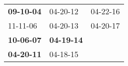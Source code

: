 \begin{supertabular}{p{0.33\columnwidth}p{0.33\columnwidth}p{0.33\columnwidth}}
 \textbf{09-10-04\textsuperscript{}} &           04-20-12\textsuperscript{} &  04-22-16\textsuperscript{} \\
          11-11-06\textsuperscript{} &           04-20-13\textsuperscript{} &  04-20-17\textsuperscript{} \\
 \textbf{10-06-07\textsuperscript{}} &  \textbf{04-19-14\textsuperscript{}} &                             \\
 \textbf{04-20-11\textsuperscript{}} &           04-18-15\textsuperscript{} &                             \\
\end{supertabular}
